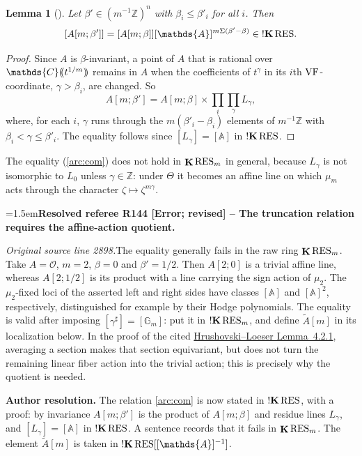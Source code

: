 \documentclass[12pt]{amsart}
\newcommand{\ResolvedRefereeRemark}[5]{%
  \par\medskip\begingroup\normalfont\small\color{gray}%
  \emergencystretch=1.5em\noindent\textbf{Resolved referee R#1 [#2] -- #3.}\par\nobreak\noindent #4\par
  \medskip\color{ResolutionGreen}\noindent\textbf{Author resolution.} #5\par
  \endgroup\medskip
}
\theoremstyle{plain}
\newtheorem{lem}[thm]{Lemma}
\theoremstyle{definition}
\theoremstyle{remark}
\numberwithin{equation}{section}
\theoremstyle{plain}
\newcommand{\VF}{\textup{VF}}
\newcommand{\OO}{\mdl O}
\newcommand{\Z}{\mathds{Z}}
\newcommand{\A}{\mathds{A}}
\newcommand{\C}{\mathds{C}}
\newcommand{\G}{\mathds{G}}
\newcommand{\0}{\emptyset}
\newcommand{\dpar}[1]{%
   (\mkern-4mu (#1 )\mkern-4mu )}
\newcommand{\mdl}[1]{\mathcal{#1}}  %
\newcommand{\efun}{\longmapsto}
\newcommand{\RES}{\textup{RES}}
\DeclareMathOperator{\ggk}{\mathbf{K}}
\DeclareMathOperator{\sggk}{!\mathbf{K}}
\begin{document}
\begin{lem}[{\cite[Lemma~4.2.1]{hru:loe:lef}}]
Let $\beta' \in (m^{-1} \Z)^n$ with $\beta_i \leq \beta'_i$ for all $i$. Then
\begin{equation}\label{arc:com}
  [A[m;\beta']] = [A[m;\beta]][\A]^{m \Sigma (\beta' - \beta)} \in \sggk \RES.
\end{equation}
\end{lem}
\begin{proof}
Since $A$ is $\beta$-invariant, a point of $A$ that is rational over $\C \dpar{t^{1/m}}$ remains in $A$ when the coefficients of $t^\gamma$ in its $i$th $\VF$-coordinate, $\gamma > \beta_i$, are changed. So
\[
A[m;\beta'] = A[m;\beta] \times \prod_i \prod_{\gamma} L_\gamma,
\]
where, for each $i$, $\gamma$ runs through the $m(\beta'_i - \beta_i)$ elements of $m^{-1}\Z$ with $\beta_i < \gamma \leq \beta'_i$. The equality follows since $[L_\gamma] = [\A]$ in $\sggk \RES$.
\end{proof}
The equality (\ref{arc:com}) does not hold in $\ggk \RES_{m}$ in general, because $L_\gamma$ is not isomorphic to $L_0$ unless $\gamma \in \Z$: under $\Theta$ it becomes an affine line on which $\mu_m$ acts through the character $\zeta \efun \zeta^{m\gamma}$.

\ResolvedRefereeRemark{144}{Error; revised}{The truncation relation requires the affine-action quotient}{%
\textit{Original source line 2898.}\quad The equality generally fails in the raw ring $\ggk\RES_m$. Take $A=\OO$, $m=2$, $\beta=0$ and $\beta'=1/2$. Then $A[2;0]$ is a trivial affine line, whereas $A[2;1/2]$ is its product with a line carrying the sign action of $\mu_2$. The $\mu_2$-fixed loci of the asserted left and right sides have classes $[\A]$ and $[\A]^2$, respectively, distinguished for example by their Hodge polynomials. The equality is valid after imposing $[\gamma^\sharp]=[\G_m]$: put it in $\sggk\RES_m$, and define $\tilde A[m]$ in its localization below. In the proof of the cited \href{https://arxiv.org/pdf/1111.1954}{Hrushovski--Loeser Lemma~4.2.1}, averaging a section makes that section equivariant, but does not turn the remaining linear fiber action into the trivial action; this is precisely why the quotient is needed.
}{The relation \eqref{arc:com} is now stated in $\sggk\RES$, with a proof: by invariance $A[m;\beta']$ is the product of $A[m;\beta]$ and residue lines $L_\gamma$, and $[L_\gamma]=[\A]$ in $\sggk\RES$. A sentence records that it fails in $\ggk\RES_m$. The element $\tilde A[m]$ is taken in $\sggk\RES[[\A]^{-1}]$.}
\end{document}

